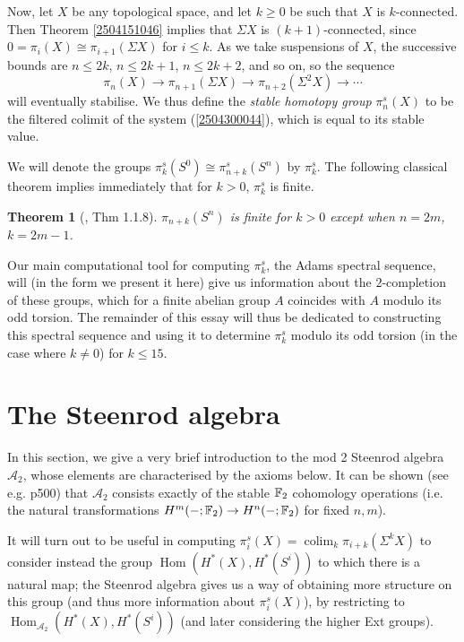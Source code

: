 \documentclass[11pt, titlepage]{article} %
\def\bb{\ensuremath\mathbb}
\def\A{\ensuremath{\mathscr{A}_2}}
\DeclareMathOperator{\colim}{colim}
\DeclareMathOperator{\Hom}{Hom}
\numberwithin{equation}{subsection}
\theoremstyle{plain}
\newtheorem{theorem}{Theorem}[subsection]
\theoremstyle{definition}
\begin{document}
Now, let \(X\) be any topological space, and let \(k\geq 0\) be such that \(X\) is \(k\)-connected. Then Theorem \ref{2504151046} implies that \(\Sigma X\) is \((k+1)\)-connected, since \(0=\pi_i(X)\cong \pi_{i+1}(\Sigma X)\) for \(i\leq k\). As we take suspensions of \(X\), the successive bounds are \(n \leq 2k\), \(n \leq 2k+1\), \(n\leq 2k+2\), and so on, so the sequence 
\begin{equation}\label{2504300044}
\pi_n(X)\to \pi_{n+1}(\Sigma X) \to \pi_{n+2}(\Sigma^2 X) \to \cdots
\end{equation}
will eventually stabilise. We thus define the \textit{stable homotopy group} \(\pi_n^s(X)\) to be the filtered colimit of the system (\ref{2504300044}), which is equal to its stable value. 

We will denote the groups \(\pi_k^s(S^0)\cong \pi^s_{n+k}(S^n)\) by \(\pi_k^s\). The following classical theorem implies immediately that for \(k>0\), \(\pi_k^s\) is finite.

\begin{theorem}[{\autocite{cobordism}, Thm 1.1.8}]
\(\pi_{n+k}(S^n)\) is finite for \(k>0\) except when \(n=2m\), \(k=2m-1\). 
\end{theorem}

Our main computational tool for computing \(\pi_k^s\), the Adams spectral sequence, will (in the form we present it here) give us information about the \(2\)-completion of these groups, which for a finite abelian group \(A\) coincides with \(A\) modulo its odd torsion. The remainder of this essay will thus be dedicated to constructing this spectral sequence and using it to determine \(\pi_k^s\) modulo its odd torsion (in the case where \(k\neq 0\)) for \(k \leq 15\). 

\section{The Steenrod algebra}\label{2503221247}

In this section, we give a very brief introduction to the mod 2 Steenrod algebra \(\A\), whose elements are characterised by the axioms below. It can be shown (see e.g. \autocite{hatcher} p500) that \(\A\) consists exactly of the stable \(\bb{F}_2\) cohomology operations (i.e. the natural transformations \(H^m(-;\bb{F}_2)\to H^n(-; \bb{F}_2)\) for fixed \(n,m\)). 

It will turn out to be useful in computing \(\pi_i^s(X)=\colim_k \pi_{i+k}(\Sigma^k X)\) to consider instead the group \(\Hom(H^*(X), H^*(S^i))\) to which there is a natural map; the Steenrod algebra gives us a way of obtaining more structure on this group (and thus more information about \(\pi_i^s(X)\)), by restricting to \(\Hom_{\A}(H^*(X), H^*(S^i))\) (and later considering the higher Ext groups).  
\end{document}
